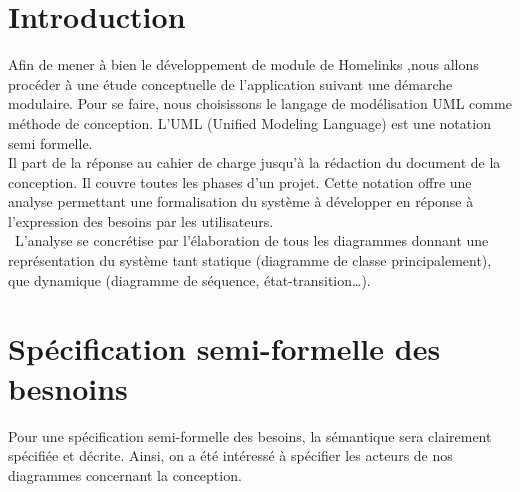 \documentclass[a4paper,10pt]{book}
\begin{document}
\section{Introduction}
\par
  Afin de mener à bien le développement de module de Homelinks ,nous allons procéder à une étude conceptuelle de l’application suivant une démarche modulaire. Pour se faire, nous choisissons le langage de modélisation UML comme méthode de conception. L’UML (Unified Modeling Language) est une notation semi formelle.  
  \\
      Il part de la réponse au cahier de charge jusqu’à la rédaction du document de la conception. Il couvre toutes les phases d'un projet. Cette notation offre une analyse permettant une formalisation du système à développer en réponse à l’expression des besoins par les utilisateurs.  
      \\\
       L’analyse se concrétise par l’élaboration de tous les diagrammes donnant une représentation du système tant statique (diagramme de classe principalement), que dynamique (diagramme de séquence, état-transition…). 
\section{Spécification semi-formelle des besnoins } 
\par Pour une spécification semi-formelle des besoins, la sémantique sera clairement spécifiée et décrite. Ainsi, on a été intéressé à spécifier les acteurs de nos diagrammes concernant la conception.
\end{document}
